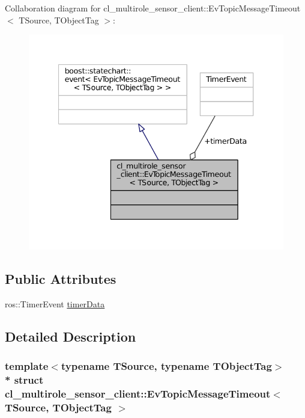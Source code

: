 Collaboration diagram for cl\+\_\+multirole\+\_\+sensor\+\_\+client\+:\+:Ev\+Topic\+Message\+Timeout$<$ T\+Source, T\+Object\+Tag $>$\+:
\nopagebreak
\begin{figure}[H]
\begin{center}
\leavevmode
\includegraphics[width=340pt]{structcl__multirole__sensor__client_1_1EvTopicMessageTimeout__coll__graph}
\end{center}
\end{figure}
\subsection*{Public Attributes}
\begin{DoxyCompactItemize}
\item 
ros\+::\+Timer\+Event \hyperlink{structcl__multirole__sensor__client_1_1EvTopicMessageTimeout_aac8fac38d0a1c22ece1370359d41f6be}{timer\+Data}
\end{DoxyCompactItemize}


\subsection{Detailed Description}
\subsubsection*{template$<$typename T\+Source, typename T\+Object\+Tag$>$\\*
struct cl\+\_\+multirole\+\_\+sensor\+\_\+client\+::\+Ev\+Topic\+Message\+Timeout$<$ T\+Source, T\+Object\+Tag $>$}



